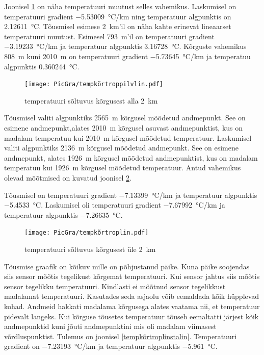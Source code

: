 \documentclass{trkut}%
\begin{document}
Joonisel \ref{tempkõrtroppilvlin} on näha temperatuuri muutust selles vahemikus. Laskumisel on temperatuuri gradient \SI{-5.53009}{\degreeCelsius/km} ning temperatuur algpunktis on \SI{2.12611}{\degreeCelsius}. Tõusmisel esimese \SI{2}{km}'il on näha kahte erinevat lineaarset temperatuuri muutust. Esimesel \SI{793}{m}'il on temperatuuri gradient \SI{-3.19233}{\degreeCelsius/km} ja temperatuur algpunktis \SI{3.16728}{\degreeCelsius}. Kõrguste vahemikus \SI{808}{m} kuni \SI{2010}{m} on temperatuuri gradient \SI{-5.73645}{\degreeCelsius/km} ja temperatuu algpunktis \SI{0.360244}{\degreeCelsius}.

\begin{figure}[h]
	\texttt{[image: PicGra/tempkõrtroppilvlin.pdf]}
	\caption{temperatuuri sõltuvus kõrgusest alla \SI{2}{km}}
	\label{tempkõrtroppilvlin}%
\end{figure}


Tõusmisel valiti algpunktiks \SI{2565}{m} kõrgusel mõõdetud andmepunkt. See on esimene andmepunkt,alates \SI{2010}{m} kõrgusel asuvast andmepunktist, kus on madalam temperatuu kui \SI{2010}{m} kõrgusel mõõdetud temperatuur. Laskumisel valiti algpunktiks \SI{2136}{m} kõrgusel mõõdetud andmepunkt. See on esimene andmepunkt, alates \SI{1926}{m} kõrgusel mõõdetud andmepunktist, kus on madalam temperatuu kui \SI{1926}{m} kõrgusel mõõdetud temperatuur. Antud vahemikus olevad mõõtmised on kuvatud joonisel \ref{tempkõrtroplin}.

Tõusmisel on temperatuuri gradient \SI{-7.13399}{\degreeCelsius/km} ja temperatuur algpunktis \SI{-5.4533}{\celsius}. Laskumisel oli temperatuuri gradient \SI{-7.67992}{\degreeCelsius/km} ja temperatuur algpunktis \SI{-7.26635}{\celsius}.

\begin{figure}[h]
	\texttt{[image: PicGra/tempkõrtroplin.pdf]}
	\caption{temperatuuri sõltuvus kõrgusest üle \SI{2}{km}}
	\label{tempkõrtroplin}%
\end{figure}

Tõusmise graafik on kõikuv mille on põhjustanud päike. Kuna päike soojendas siis sensor mõõtis tegelikust kõrgemat temperatuuri. Kui sensor jahtus siis mõõtis sensor tegelikku temperatuuri. Kindlasti ei mõõtnud sensor tegelikkust madalamat temperatuuri. Kasutades seda asjaolu võib eemaldada kõik hüpplevad kohad. Andmeid hakkati madalama kõrgusega alates vaatama nii, et temperatuur pidevalt langeks. Kui kõrguse tõusetes temperatuur tõuseb eemaltatti järjest kõik andmepunktid kuni jõuti andmepunktini mis oli madalam viimasest võrdluspunktist. Tulemus on joonisel \ref{tempkõrtroplinstalin}. Temperatuuri gradient on \SI{-7.23193}{\degreeCelsius/km} ja temperatuur algpunktis \SI{-5.961}{\celsius}.
\end{document}

